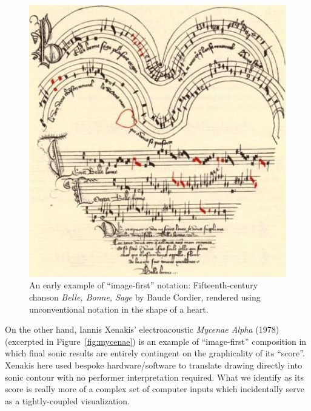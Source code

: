             \begin{figure} 
                \centering
                \includegraphics[width=.5\textwidth]{images/chapter2/bellebonnesage.jpg}
                \captionsetup{width=.5\textwidth}
                \caption[An early example of what might be considered ``image-first'' notation: Fifteenth-century chanson \textit{Belle, Bonne, Sage} by Baude Cordier, rendered using unconventional notation in the shape of a heart.]{An early example of ``image-first'' notation: Fifteenth-century chanson \textit{Belle, Bonne, Sage} by Baude Cordier, rendered using unconventional notation in the shape of a heart.\footnotemark}
                \label{fig:heart}
            \end{figure}
    
    On the other hand, Iannis Xenakis' electroacoustic \textit{Mycenae Alpha} (1978) (excerpted in Figure~\ref{fig:mycenae}) is an example of ``image-first'' composition in which final sonic results are entirely contingent on the graphicality of its ``score''. Xenakis here used bespoke hardware/software to translate drawing directly into sonic contour with no performer interpretation required. What we identify as its score is really more of a complex set of computer inputs which incidentally serve as a tightly-coupled visualization.

